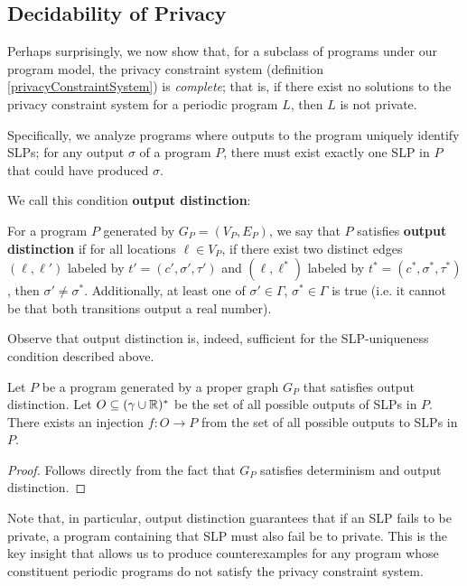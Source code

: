 \subsection{Decidability of Privacy}\label{svDecidingPrivacySection}

Perhaps surprisingly, we now show that, for a subclass of programs under our program model, the privacy constraint system (definition \ref{privacyConstraintSystem}) is \textit{complete}; that is, if there exist no solutions to the privacy constraint system for a periodic program $L$, then $L$ is not private. 

Specifically, we analyze programs where outputs to the program uniquely identify SLPs; for any output $\sigma$ of a program $P$, there must exist exactly one SLP in $P$ that could have produced $\sigma$. 

We call this condition \textbf{output distinction}:

\begin{defn}\label{outputDistinctionDef}
    For a program $P$ generated by $G_P = (V_P, E_P)$, we say that $P$ satisfies \textbf{output distinction} if for all locations $\ell\in V_P$, if there exist two distinct edges $(\ell, \ell')$ labeled by $t'=(c', \sigma', \tau')$ and $(\ell, \ell^*)$ labeled by $t^* = (c^*, \sigma^*, \tau^*)$, then $\sigma' \neq \sigma^*$. Additionally, at least one of $\sigma'\in \Gamma$, $\sigma^*\in \Gamma$ is true (i.e. it cannot be that both transitions output a real number).
\end{defn}

Observe that output distinction is, indeed, sufficient for the SLP-uniqueness condition described above.

\begin{prop}
    Let $P$ be a program generated by a proper graph $G_P$ that satisfies output distinction. Let $O\subseteq (\gamma\cup \mathbb{R})^*$ be the set of all possible outputs of SLPs in $P$. There exists an injection $f: O\to P$ from the set of all possible outputs to SLPs in $P$. 
\end{prop}
\begin{proof}
    Follows directly from the fact that $G_P$ satisfies determinism and output distinction. 
\end{proof}

Note that, in particular, output distinction guarantees that if an SLP fails to be private, a program containing that SLP must also fail be to private. This is the key insight that allows us to produce counterexamples for any program whose constituent periodic programs do not satisfy the privacy constraint system. 

